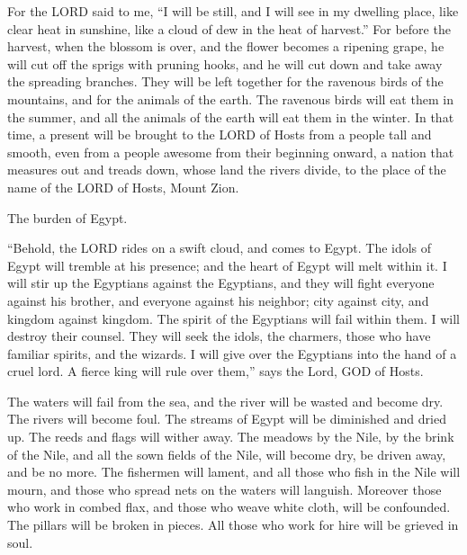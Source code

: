 \myverse{}For the LORD said to me, “I will be still, and I will see in my
dwelling place, like clear heat in sunshine, like a cloud of dew in the heat of harvest.”
\myverse{}For before the harvest, when the blossom is over, and the flower becomes a
ripening grape, he will cut off the sprigs with pruning hooks, and he will cut down and take away the
spreading branches.
\myverse{}They will be left together for the ravenous birds of the mountains, and for
the animals of the earth. The ravenous birds will eat them in the summer, and all the animals of the earth
will eat them in the winter.
\myverse{}In that time, a present will be brought to the LORD of Hosts from a people
tall and smooth, even from a people awesome from their beginning onward, a nation that measures out and
treads down, whose land the rivers divide, to the place of the name of the LORD of Hosts, Mount Zion.


\mychapter{} \myverse*{}The burden of Egypt.

\quad\quad “Behold, the LORD rides on a swift cloud, and comes to Egypt. The idols of Egypt will tremble
at his presence; and the heart of Egypt will melt within it.
\myverse{}I will stir up the Egyptians against the Egyptians, and they will fight everyone
against his brother, and everyone against his neighbor; city against city, and kingdom against kingdom.
\myverse{}The spirit of the Egyptians will fail within them. I will destroy their counsel.
They will seek the idols, the charmers, those who have familiar spirits, and the wizards.
\myverse{}I will give over the Egyptians into the hand of a cruel lord. A fierce king
will rule over them,” says the Lord, GOD of Hosts.

\myverse{}The waters will fail from the sea, and the river will be wasted
and become dry.
\myverse{}The rivers will become foul. The streams of Egypt will be diminished and dried
up. The reeds and flags will wither away.
\myverse{}The meadows by the Nile, by the brink of the Nile, and all the sown fields
of the Nile, will become dry, be driven away, and be no more.
\myverse{}The fishermen will lament, and all those who fish in the Nile will mourn, and
those who spread nets on the waters will languish.
\myverse{}Moreover those who work in combed flax, and those who weave white cloth, will
be confounded.
\myverse{}The pillars will be broken in pieces. All those who work for hire will be
grieved in soul.

